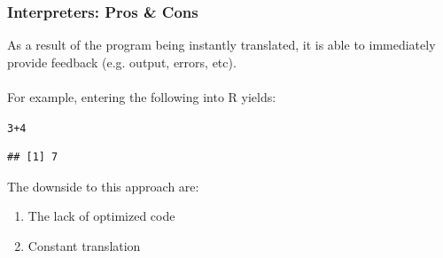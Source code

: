 \documentclass{beamer}\usepackage[]{graphicx}\usepackage[]{color}
\makeatletter
\newcommand{\hlnum}[1]{\textcolor[rgb]{0.686,0.059,0.569}{#1}}%
\newcommand{\hlopt}[1]{\textcolor[rgb]{0,0,0}{#1}}%
\newenvironment{kframe}{%
 \def\at@end@of@kframe{}%
 \ifinner\ifhmode%
  \def\at@end@of@kframe{\end{minipage}}%
  \begin{minipage}{\columnwidth}%
 \fi\fi%
 \def\FrameCommand##1{\hskip\@totalleftmargin \hskip-\fboxsep
 \colorbox{shadecolor}{##1}\hskip-\fboxsep
     \hskip-\linewidth \hskip-\@totalleftmargin \hskip\columnwidth}%
 \MakeFramed {\advance\hsize-\width
   \@totalleftmargin\z@ \linewidth\hsize
   \@setminipage}}%
 {\par\unskip\endMakeFramed%
 \at@end@of@kframe}
\newenvironment{knitrout}{}{} %
\makeatother
\begin{document}
\begin{frame}[fragile]
\frametitle{Interpreters: Pros \& Cons}
As a result of the program being instantly translated, it is able to immediately provide feedback (e.g. output, errors, etc).\\$ $\\

For example, entering the following into R yields:
\begin{knitrout}
\color{fgcolor}\begin{kframe}
\begin{alltt}
\hlnum{3}\hlopt{+}\hlnum{4}
\end{alltt}
\begin{verbatim}
## [1] 7
\end{verbatim}
\end{kframe}
\end{knitrout}

The downside to this approach are:
\begin{enumerate}
\item The lack of optimized code 
\item Constant translation
\end{enumerate}

\end{frame}
\end{document}
